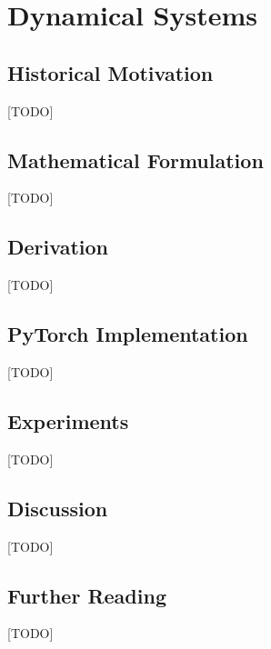 
\chapter{Dynamical Systems}
\label{ch:02_dynamical_systems}


\section{Historical Motivation}
[TODO]

\section{Mathematical Formulation}
[TODO]

\section{Derivation}
[TODO]

\section{PyTorch Implementation}
[TODO]

\section{Experiments}
[TODO]

\section{Discussion}
[TODO]

\section{Further Reading}
[TODO]
